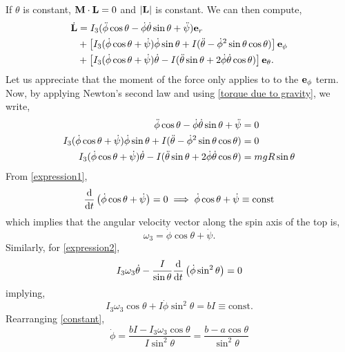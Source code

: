 \documentclass{book}
\begin{document}
If $\theta$ is constant, $\vb{M}\cdot\vb{L}=0$ and $|\vb{L}|$ is constant. We can then compute,
\begin{equation}
	\begin{split}
		\Dot{\vb{L}} & = I_3(\Ddot{\phi}\cos\theta - \Dot{\phi}\Dot{\theta}\sin\theta + \Ddot{\psi})\vb{e}_r \\
		& + \left[I_3(\Dot{\phi}\cos\theta + \Dot{\psi})\Dot{\phi}\sin\theta + I(\Ddot{\theta} - \Dot{\phi}^2\sin\theta\cos\theta)\right]\vb{e}_{\phi} \\
		& + \left[I_3(\Dot{\phi}\cos\theta + \Dot{\psi})\Dot{\theta} - I(\Ddot{\theta}\sin\theta + 2\Dot{\phi}\Dot{\theta}\cos\theta)\right]\vb{e}_{\theta}.
	\end{split}
\end{equation}
Let us appreciate that the moment of the force only applies to to the $\vb{e}_{\phi}$ term. Now, by applying Newton's second law and using \eqref{torque due to gravity}, we write,
\begin{align}
	\Ddot{\phi}\cos\theta - \Dot{\phi}\Dot{\theta}\sin\theta + \Ddot{\psi} & = 0 \label{expression1} \\
	I_3(\Dot{\phi}\cos\theta + \Dot{\psi})\Dot{\phi}\sin\theta + I(\Ddot{\theta} - \Dot{\phi}^2\sin\theta\cos\theta) & = 0 \label{expression2} \\
	I_3(\Dot{\phi}\cos\theta + \Dot{\psi})\Dot{\theta} - I(\Ddot{\theta}\sin\theta + 2\Dot{\phi}\Dot{\theta}\cos\theta) & = mgR\sin\theta \label{expression3}
\end{align}
From \eqref{expression1},
\begin{equation}
	\dv{}{t} \left(\Dot{\phi}\cos\theta + \Dot{\psi}\right) = 0 \implies \Dot{\phi}\cos\theta + \Dot{\psi} \equiv \text{const}
\end{equation}
which implies that the angular velocity vector along the spin axis of the top is,
\begin{equation}
	\omega_3 = \Dot{\phi}\cos\theta + \Dot{\psi}.
\end{equation}
Similarly, for \eqref{expression2},
\begin{equation}
	I_3\omega_3\Dot{\theta} - \frac{I}{\sin\theta}\dv{}{t}\left(\Dot{\phi}\sin^2\theta\right) = 0
\end{equation}
implying,
\begin{equation}
	I_3\omega_3 \cos\theta + I\Dot{\phi}\sin^2\theta = bI \equiv \text{const}. \label{constant}
\end{equation}
Rearranging \eqref{constant},
\begin{equation}
	\Dot{\phi} = \frac{bI - I_3 \omega_3 \cos\theta}{I\sin^2\theta} = \frac{b-a\cos\theta}{\sin^2\theta}
\end{equation}
\end{document}
